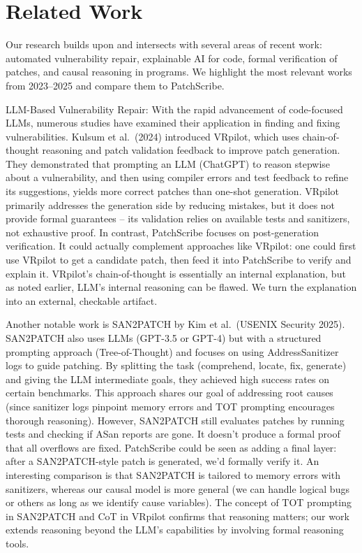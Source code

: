 \documentclass[conference,compsoc]{IEEEtran}
\begin{document}
\section{Related Work}\label{related-work}

Our research builds upon and intersects with several areas of recent
work: automated vulnerability repair, explainable AI for code, formal
verification of patches, and causal reasoning in programs. We highlight
the most relevant works from 2023--2025 and compare them to PatchScribe.

LLM-Based Vulnerability Repair: With the rapid advancement of
code-focused LLMs, numerous studies have examined their application in
finding and fixing vulnerabilities. Kulsum et al.~(2024) introduced
VRpilot, which uses chain-of-thought reasoning and patch validation
feedback to improve patch generation. They demonstrated that prompting
an LLM (ChatGPT) to reason stepwise about a vulnerability, and then
using compiler errors and test feedback to refine its suggestions,
yields more correct patches than one-shot generation. VRpilot primarily
addresses the generation side by reducing mistakes, but it does not
provide formal guarantees -- its validation relies on available tests
and sanitizers, not exhaustive proof. In contrast, PatchScribe focuses
on post-generation verification. It could actually complement approaches
like VRpilot: one could first use VRpilot to get a candidate patch, then
feed it into PatchScribe to verify and explain it. VRpilot's
chain-of-thought is essentially an internal explanation, but as noted
earlier, LLM's internal reasoning can be flawed. We turn the explanation
into an external, checkable artifact.

Another notable work is SAN2PATCH by Kim et al.~(USENIX Security 2025).
SAN2PATCH also uses LLMs (GPT-3.5 or GPT-4) but with a structured
prompting approach (Tree-of-Thought) and focuses on using
AddressSanitizer logs to guide patching. By splitting the task
(comprehend, locate, fix, generate) and giving the LLM intermediate
goals, they achieved high success rates on certain benchmarks. This
approach shares our goal of addressing root causes (since sanitizer logs
pinpoint memory errors and TOT prompting encourages thorough reasoning).
However, SAN2PATCH still evaluates patches by running tests and checking
if ASan reports are gone. It doesn't produce a formal proof that all
overflows are fixed. PatchScribe could be seen as adding a final layer:
after a SAN2PATCH-style patch is generated, we'd formally verify it. An
interesting comparison is that SAN2PATCH is tailored to memory errors
with sanitizers, whereas our causal model is more general (we can handle
logical bugs or others as long as we identify cause variables). The
concept of TOT prompting in SAN2PATCH and CoT in VRpilot confirms that
reasoning matters; our work extends reasoning beyond the LLM's
capabilities by involving formal reasoning tools.
\end{document}
